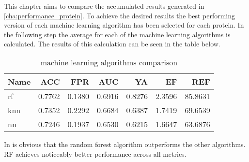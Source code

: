 This chapter aims to compare the accumulated results generated in \ref{cha:performance_protein}.
To achieve the desired results the best performing version of each machine learning algorithm has been selected for each protein.
In the following step the average for each of the machine learning algorithms is calculated.
The results of this calculation can be seen in the table below.

\begin{table}[H]
    \begin{center}
        \caption{machine learning algorithms comparison}
        \begin{tabular}{lrrrrrr}
            \toprule
            Name & ACC    & FPR    & AUC    & YA     & EF     & REF     \\
            \midrule
            rf   & 0.7762 & 0.1380 & 0.6916 & 0.8276 & 2.3596 & 85.8631 \\
            knn  & 0.7352 & 0.2292 & 0.6684 & 0.6387 & 1.7419 & 69.6539 \\
            nn   & 0.7246 & 0.1937 & 0.6530 & 0.6215 & 1.6647 & 63.6876 \\
            \bottomrule
        \end{tabular}
    \end{center}
\end{table}

In is obvious that the random forest algorithm outperforms the other algorithms.
RF achieves noticeably better performance across all metrics.